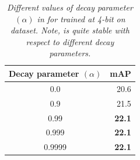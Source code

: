 \begin{table}[]
\centering
\caption{\em Different values of decay parameter $(\alpha)$ in \exma{} for  trained at 4-bit on \coco{} dataset. Note, \exma{} is quite stable with respect to different decay parameters. }
\vspace{1ex}
\label{tab:diff-mom-ema}
\begin{tabular}{cr}
\toprule
Decay parameter $(\alpha)$ & mAP  \\
\midrule
0.0              & 20.6 \\
0.9            & 21.5 \\
\cellcolor{myGray} 0.99           & \cellcolor{myGray}\textbf{22.1} \\
\cellcolor{myGray} 0.999          & \cellcolor{myGray} \textbf{22.1} \\
\cellcolor{myGray} 0.9999         & \cellcolor{myGray} \textbf{22.1} \\
\bottomrule
\end{tabular}
\end{table}
